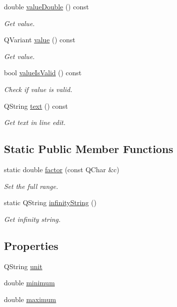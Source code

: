 \begin{DoxyCompactItemize}
double \hyperlink{classmdt_double_edit_a2ffc11c9f013ff65b49642703146ec01}{value\-Double} () const 
\begin{DoxyCompactList}\small\item\em Get value. \end{DoxyCompactList}\item 
Q\-Variant \hyperlink{classmdt_double_edit_a6987992984d3cfab5f96467c2b98e511}{value} () const 
\begin{DoxyCompactList}\small\item\em Get value. \end{DoxyCompactList}\item 
bool \hyperlink{classmdt_double_edit_a530a3b818aba14e34636dc1ad36b9292}{value\-Is\-Valid} () const 
\begin{DoxyCompactList}\small\item\em Check if value is valid. \end{DoxyCompactList}\item 
Q\-String \hyperlink{classmdt_double_edit_a169b321873e50e1e9bf2b15bbf12af78}{text} () const 
\begin{DoxyCompactList}\small\item\em Get text in line edit. \end{DoxyCompactList}\end{DoxyCompactItemize}
\subsection*{Static Public Member Functions}
\begin{DoxyCompactItemize}
\item 
static double \hyperlink{classmdt_double_edit_a8156deaebbd3256e9e7d94ca84e6a03a}{factor} (const Q\-Char \&c)
\begin{DoxyCompactList}\small\item\em Set the full range. \end{DoxyCompactList}\item 
static Q\-String \hyperlink{classmdt_double_edit_a09e6276d61dd02feea43e795417d8ea9}{infinity\-String} ()
\begin{DoxyCompactList}\small\item\em Get infinity string. \end{DoxyCompactList}\end{DoxyCompactItemize}
\subsection*{Properties}
\begin{DoxyCompactItemize}
\item 
Q\-String \hyperlink{classmdt_double_edit_a163c58477dc88637f999f56714df74ee}{unit}
\item 
double \hyperlink{classmdt_double_edit_adc63b2b7f47fac62e44673d51444776e}{minimum}
\item 
double \hyperlink{classmdt_double_edit_a80edcc2b96d1111f608037f058596c02}{maximum}
\end{DoxyCompactItemize}


